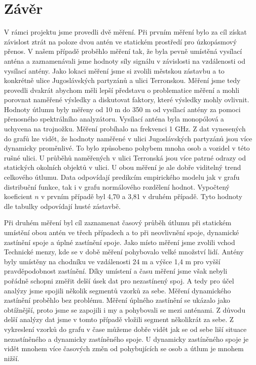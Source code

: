 \chapter*{Závěr} %
V rámci projektu jsme provedli dvě měření. Při prvním měření bylo za cíl získat závislost ztrát na poloze dvou antén ve statickém prostředí pro úzkopásmový přenos. V našem případě proběhlo měření tak, že byla pevně umístěná vysílací anténa a zaznamenávali jsme hodnoty síly signálu v závislosti na vzdálenosti od vysílací antény. Jako lokaci měření jsme si zvolili městskou zástavbu a to konkrétně ulice Jugoslávských partyzánů a ulici Terronskou. Měření jsme tedy provedli dvakrát abychom měli lepší představu o problematice měření a mohli porovnat naměřené výsledky a diskutovat faktory, které výsledky mohly ovlivnit.
Hodnoty útlumu byly měřeny od 10 m do 350 m od vysílací antény za pomoci přenosného spektrálního analyzátoru. Vysílací anténa byla monopólová a uchycena na trojnožku. Měření probíhalo na frekvenci 1 GHz. 
Z dat vynesených do grafů lze vidět, že hodnoty naměřené v ulici Jugoslávských partyzánů jsou více dynamicky proměnlivé. To bylo způsobeno pohybem mnoha osob a vozidel v této rušné ulici. U průběhů naměřených v ulici Terronská jsou více patrné odrazy od statických okolních objektů v ulici. U obou měření je ale dobře viditelný trend celkového útlumu. Data odpovídají predikcím empirického modelu jak v grafu distribuční funkce, tak i v grafu normálového rozdělení hodnot. Vypočtený koeficient $n$ v prvním případě byl 4,70 a 3,81 v druhém případě. Tyto hodnoty dle tabulky odpovídají husté zástavbě.

Při druhém měření byl cíl zaznamenat časový průběh útlumu při statickém umístění obou antén ve třech případech a to při neovlivnění spoje, dynamické zastínění spoje a úplné zastínění spoje. 
Jako místo měření jsme zvolili vchod Technické menzy, kde se v době měření pohybovalo velké množství lidí. Antény byly umístěny na chodníku ve vzdálenosti 24 m a výšce 1,4 m pro vyšší pravděpodobnost zastínění. 
Díky umístení a času měření jsme však nebyli pořádně schopni změřit delší úsek dat pro nezastínený spoj. A tedy pro účel analýzy jsme spojili několik segmentů vzorků za sebe. Měření dynamického zastínění proběhlo bez problému. Měření úplného zastínění se ukázalo jako obtížnější, proto jsme se zapojili i my a pohybovali se mezi anténami. Z důvodu delší analýzy dat jsme v tomto případě vložili segment několikrát za sebe. 
Z vykreslení vzorků do grafu v čase můžeme dobře vidět jak se od sebe liší situace nezastíněného a dynamicky zastíněného spoje. U dynamicky zastíněného spoje je vidět mnohem více časových změn od pohybujících se osob a útlum je mnohem nižší.

